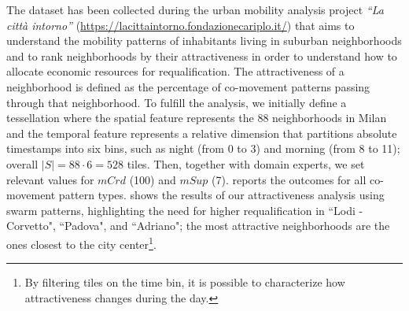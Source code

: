 \documentclass[
]{ceurart}
\renewcommand{\sf}[1]{\textsf{\textup{#1}}}
\begin{document}
%
%
%
The dataset has been collected during the urban mobility analysis project \textit{``La città intorno''} (\url{https://lacittaintorno.fondazionecariplo.it/}) that aims to understand the mobility patterns of inhabitants living in suburban neighborhoods
and to rank neighborhoods by their attractiveness in order to understand how to allocate economic resources for requalification.
The attractiveness of a neighborhood is defined as the percentage of co-movement patterns passing through that neighborhood.
To fulfill the analysis, we initially define a tessellation where the spatial feature represents the 88 neighborhoods in Milan 
and the temporal feature represents a relative dimension that partitions absolute timestamps into six bins, such as night (from 0 to 3) and morning (from 8 to 11); overall $|S| = 88 \cdot 6 = 528$ tiles.
Then, together with domain experts, we set relevant values for $mCrd$ (100) and $mSup$ (7). 
 reports the outcomes for all co-movement pattern types.
 shows the results of our attractiveness analysis using swarm patterns, highlighting the need for higher requalification in ``Lodi - Corvetto", ``Padova", and ``Adriano"; the most attractive neighborhoods are the ones closest to the city center\footnote{By filtering tiles on the time bin, it is possible to characterize how attractiveness changes during the day.}.
\end{document}
